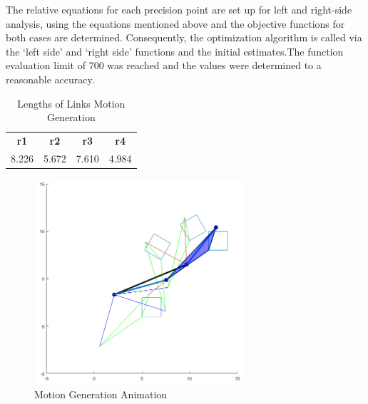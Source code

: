 \documentclass[12pt]{article}
\begin{document}
The relative equations for each precision point are set up for left and right-side analysis, using the equations mentioned above and the objective functions for both cases are determined. Consequently, the optimization algorithm is called via the ‘left side’ and ‘right side’ functions and the initial estimates.The function evaluation limit of 700 was reached and the values were determined to a reasonable accuracy.
\begin{table}[H]
  \centering
  \caption{Lengths of Links Motion Generation}
    \begin{tabular}{cccc}
    \textbf{r1}    & \textbf{r2}    & \textbf{r3}    & \textbf{r4} \\
    8.226 & 5.672 & 7.610 & 4.984 \\
    \end{tabular}%
\end{table}%
\begin{figure}[H]
    \centering
    \includegraphics[width=0.7\textwidth,height=3in]{MG_8.png}
    \caption{Motion Generation Animation}
\end{figure}
\end{document}
